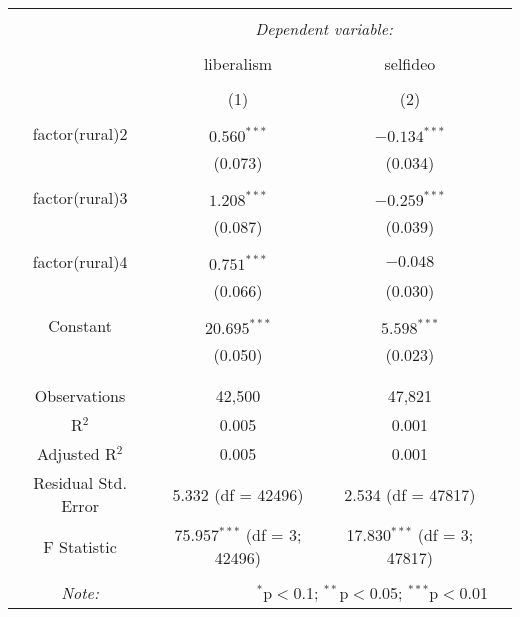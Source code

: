 \documentclass[12pt, titlepage]{article}
\begin{document}
\begin{table}[!htbp] \centering 
	\caption{} 
	\label{} 
	\begin{tabular}{@{\extracolsep{5pt}}cccc } 
		\\[-1.8ex]\hline 
		\hline \\[-1.8ex] 
		& \multicolumn{2}{c}{\textit{Dependent variable:}} \\ 
		\cline{2-3} 
		\\[-1.8ex] & \multicolumn{1}{c}{liberalism} & \multicolumn{1}{c}{selfideo} \\ 
		\\[-1.8ex] & \multicolumn{1}{c}{(1)} & \multicolumn{1}{c}{(2)}\\ 
		\hline \\[-1.8ex] 
		factor(rural)2 & $0.560^{***}$ & $-0.134^{***}$ \\ 
		& (0.073) & (0.034) \\ 
		& & \\ 
		factor(rural)3 & $1.208^{***}$ & $-0.259^{***}$ \\ 
		& (0.087) & (0.039) \\ 
		& & \\ 
		factor(rural)4 & $0.751^{***}$ & $-0.048 $\\ 
		& (0.066) & (0.030) \\ 
		& & \\ 
		Constant & $20.695^{***}$ & $5.598^{***}$ \\ 
		& (0.050) & (0.023) \\ 
		& & \\ 
		\hline \\[-1.8ex] 
		Observations & \multicolumn{1}{c}{42,500} & \multicolumn{1}{c}{47,821} \\ 
		R$^{2}$ & \multicolumn{1}{c}{0.005} & \multicolumn{1}{c}{0.001} \\ 
		Adjusted R$^{2}$ & \multicolumn{1}{c}{0.005} & \multicolumn{1}{c}{0.001} \\ 
		Residual Std. Error & \multicolumn{1}{c}{5.332 (df = 42496)} & \multicolumn{1}{c}{2.534 (df = 47817)} \\ 
		F Statistic & \multicolumn{1}{c}{75.957$^{***}$ (df = 3; 42496)} & \multicolumn{1}{c}{17.830$^{***}$ (df = 3; 47817)} \\ 
		\hline 
		\hline \\[-1.8ex] 
		\textit{Note:}  & \multicolumn{2}{r}{$^{*}$p$<$0.1; $^{**}$p$<$0.05; $^{***}$p$<$0.01} \\ 
	\end{tabular} 
\end{table} 
\end{document}
